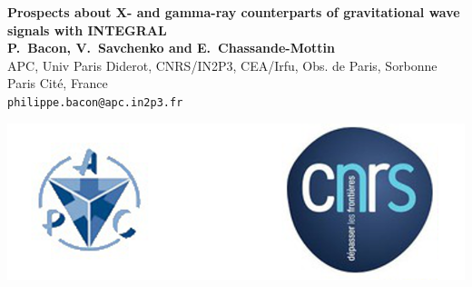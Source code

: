 \documentclass[a0,portrait]{a0poster}
\begin{document}


\begin{minipage}[b]{0.75\linewidth}
  \Huge \textbf{ 	Prospects about X- and gamma-ray counterparts of gravitational wave signals with INTEGRAL}\\[1cm] %
  \large \textbf{P.~Bacon, V.~Savchenko and E.~Chassande-Mottin}\\[1cm] %
  \normalsize APC, Univ Paris Diderot, CNRS/IN2P3, CEA/Irfu, Obs. de Paris, Sorbonne Paris Cit\'e, France\\
  \large \texttt{philippe.bacon@apc.in2p3.fr}\\
\end{minipage}
%
\begin{minipage}[b]{0.25\linewidth}
	\includegraphics[scale=.8]{logo.png}
\end{minipage}

\vspace{1cm} %

\end{document}
